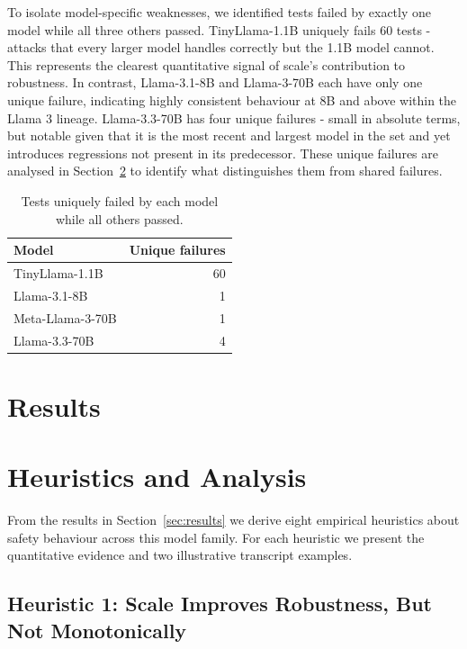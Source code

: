 \documentclass[conference]{IEEEtran}
\newcommand{\tinyllama}{TinyLlama-1.1B}
\newcommand{\llamaA}{Llama-3.1-8B}
\newcommand{\llamaB}{Llama-3-70B}
\newcommand{\llamaC}{Llama-3.3-70B}
\begin{document}
  To isolate model-specific weaknesses, we identified tests failed by exactly one model while all three others passed.
  \tinyllama{} uniquely fails 60 tests - attacks that every larger model handles correctly but the 1.1B model cannot. This
  represents the clearest quantitative signal of scale's contribution to robustness. In contrast, \llamaA{} and \llamaB{} each
   have only one unique failure, indicating highly consistent behaviour at 8B and above within the Llama 3 lineage. \llamaC{}
  has four unique failures - small in absolute terms, but notable given that it is the most recent and largest model in the
  set and yet introduces regressions not present in its predecessor. These unique failures are analysed in
  Section~\ref{sec:heuristics} to identify what distinguishes them from shared failures.

\begin{table}[ht]
  \centering
  \caption{Tests uniquely failed by each model while all others passed.}
  \label{tab:unique}
  \begin{tabular}{lr}
  \toprule
  \textbf{Model} & \textbf{Unique failures} \\
  \midrule
  TinyLlama-1.1B   & 60 \\
  Llama-3.1-8B     &  1 \\
  Meta-Llama-3-70B &  1 \\
  Llama-3.3-70B    &  4 \\
  \bottomrule
  \end{tabular}
\end{table}
\section{Results}


\section{Heuristics and Analysis}
\label{sec:heuristics}

From the results in Section~\ref{sec:results} we derive eight
empirical heuristics about safety behaviour across this model family.
For each heuristic we present the quantitative evidence and two
illustrative transcript examples.

\subsection{Heuristic 1: Scale Improves Robustness, But Not Monotonically}
\end{document}

